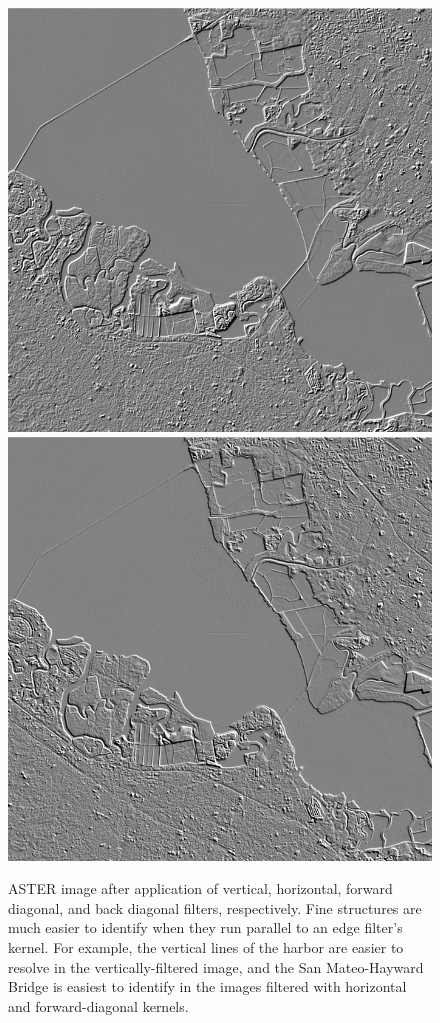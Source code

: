 \documentclass[12pt]{article}
\begin{document}
\begin{figure}[h!]
    \vspace{.2em}
    \includegraphics[width=.48\linewidth]{figures/p8/aster_diagonal1.png}
    \includegraphics[width=.48\linewidth]{figures/p8/aster_diagonal2.png}
    \caption{ASTER image after application of vertical, horizontal, forward diagonal, and back diagonal filters, respectively. Fine structures are much easier to identify when they run parallel to an edge filter's kernel. For example, the vertical lines of the harbor are easier to resolve in the vertically-filtered image, and the San Mateo-Hayward Bridge is easiest to identify in the images filtered with horizontal and forward-diagonal kernels.}
    \label{p8_edgesteps}
\end{figure}
\end{document}
